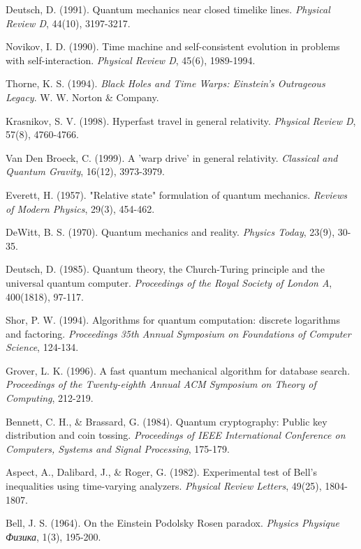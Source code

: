 \documentclass[12pt,a4paper]{article}
\begin{document}
\begin{thebibliography}{99}
Deutsch, D. (1991). Quantum mechanics near closed timelike lines. \textit{Physical Review D}, 44(10), 3197-3217.

Novikov, I. D. (1990). Time machine and self-consistent evolution in problems with self-interaction. \textit{Physical Review D}, 45(6), 1989-1994.

Thorne, K. S. (1994). \textit{Black Holes and Time Warps: Einstein's Outrageous Legacy}. W. W. Norton \& Company.

Krasnikov, S. V. (1998). Hyperfast travel in general relativity. \textit{Physical Review D}, 57(8), 4760-4766.

Van Den Broeck, C. (1999). A 'warp drive' in general relativity. \textit{Classical and Quantum Gravity}, 16(12), 3973-3979.

Everett, H. (1957). "Relative state" formulation of quantum mechanics. \textit{Reviews of Modern Physics}, 29(3), 454-462.

DeWitt, B. S. (1970). Quantum mechanics and reality. \textit{Physics Today}, 23(9), 30-35.

Deutsch, D. (1985). Quantum theory, the Church-Turing principle and the universal quantum computer. \textit{Proceedings of the Royal Society of London A}, 400(1818), 97-117.

Shor, P. W. (1994). Algorithms for quantum computation: discrete logarithms and factoring. \textit{Proceedings 35th Annual Symposium on Foundations of Computer Science}, 124-134.

Grover, L. K. (1996). A fast quantum mechanical algorithm for database search. \textit{Proceedings of the Twenty-eighth Annual ACM Symposium on Theory of Computing}, 212-219.

Bennett, C. H., \& Brassard, G. (1984). Quantum cryptography: Public key distribution and coin tossing. \textit{Proceedings of IEEE International Conference on Computers, Systems and Signal Processing}, 175-179.

Aspect, A., Dalibard, J., \& Roger, G. (1982). Experimental test of Bell's inequalities using time-varying analyzers. \textit{Physical Review Letters}, 49(25), 1804-1807.

Bell, J. S. (1964). On the Einstein Podolsky Rosen paradox. \textit{Physics Physique Физика}, 1(3), 195-200.


\end{thebibliography}
\end{document}
